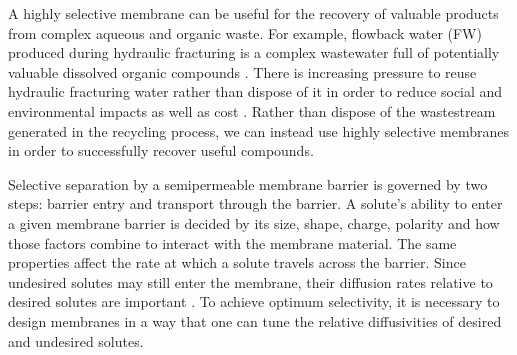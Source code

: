 \documentclass[journal=jpcbfk,manusciprt=article]{achemso}
\begin{document}
  A highly selective membrane can be useful for the recovery of valuable products
  from complex aqueous and organic waste.
  For example, flowback water (FW) produced during hydraulic fracturing is a complex
  wastewater full of potentially valuable dissolved organic compounds
  \cite{dischinger_application_2017}. There is increasing pressure to reuse
  hydraulic fracturing water rather than dispose of it in order to reduce social
  and environmental impacts as well as cost \cite{theodori_hydraulic_2014}.
  Rather than dispose of the wastestream generated in the recycling process, we
  can instead use highly selective membranes in order to successfully recover
  useful compounds. 
 


  Selective separation by a semipermeable membrane barrier is governed by two
  steps: barrier entry and transport through the barrier. A solute's ability to
  enter a given membrane barrier is decided by its size, shape, charge, polarity
  and how those factors combine to interact with the membrane material. The same
  properties affect the rate at which a solute travels across the barrier. Since
  undesired solutes may still enter the membrane, their diffusion rates relative
  to desired solutes are important
  \cite{gin_polymerized_2008,wijmans_solution-diffusion_1995}. To achieve optimum
  selectivity, it is necessary to design membranes in a way that one can tune the
  relative diffusivities of desired and undesired solutes. 

\end{document}
